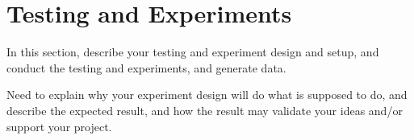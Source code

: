 \section{Testing and Experiments}
In this section, describe your testing and experiment design and setup, and conduct the testing and experiments, and generate data. 

Need to explain why your experiment design will do what is supposed to do, and describe the expected result, and how the result may validate your ideas and/or support your project. 